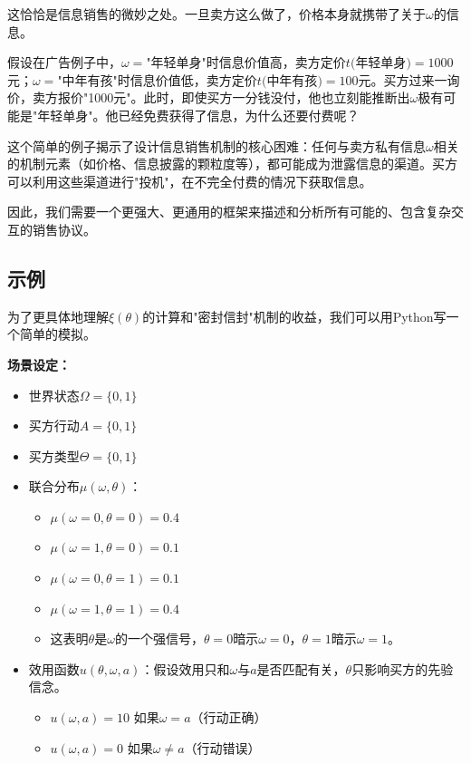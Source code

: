 这恰恰是信息销售的微妙之处。一旦卖方这么做了，价格本身就携带了关于$\omega$的信息。

假设在广告例子中，$\omega=$"年轻单身"时信息价值高，卖方定价$t($年轻单身$)= 1000$元；$\omega=$"中年有孩"时信息价值低，卖方定价$t($中年有孩$) = 100$元。买方过来一询价，卖方报价"1000元"。此时，即使买方一分钱没付，他也立刻能推断出$\omega$极有可能是"年轻单身"。他已经免费获得了信息，为什么还要付费呢？

这个简单的例子揭示了设计信息销售机制的核心困难：任何与卖方私有信息$\omega$相关的机制元素（如价格、信息披露的颗粒度等），都可能成为泄露信息的渠道。买方可以利用这些渠道进行"投机"，在不完全付费的情况下获取信息。

因此，我们需要一个更强大、更通用的框架来描述和分析所有可能的、包含复杂交互的销售协议。

\subsection{示例}

为了更具体地理解$\xi(\theta)$的计算和"密封信封"机制的收益，我们可以用Python写一个简单的模拟。

\textbf{场景设定：}
\begin{itemize}
    \item 世界状态$\Omega=\{0,1\}$
    \item 买方行动$A=\{0,1\}$
    \item 买方类型$\Theta=\{0,1\}$
    \item 联合分布$\mu(\omega,\theta)$：
       \begin{itemize}
          \item $\mu(\omega=0,\theta=0)=0.4$
          \item $\mu(\omega=1,\theta=0)=0.1$
          \item $\mu(\omega=0,\theta=1)=0.1$
          \item $\mu(\omega=1,\theta=1)=0.4$
          \item 这表明$\theta$是$\omega$的一个强信号，$\theta=0$暗示$\omega=0$，$\theta=1$暗示$\omega=1$。
       \end{itemize}
    \item 效用函数$u(\theta,\omega,a)$：假设效用只和$\omega$与$a$是否匹配有关，$\theta$只影响买方的先验信念。
       \begin{itemize}
          \item $u(\omega,a)=10$ 如果$\omega=a$（行动正确）
          \item $u(\omega,a)=0$ 如果$\omega\neq a$（行动错误）
       \end{itemize}
\end{itemize}

